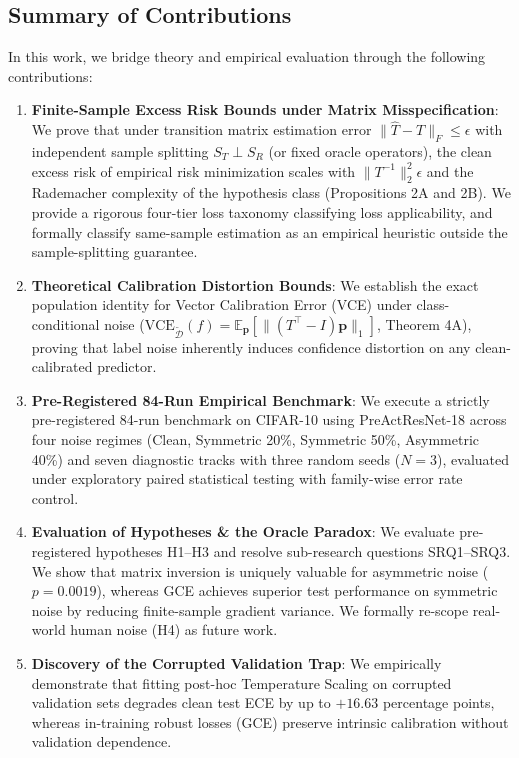 \documentclass[10pt,twocolumn]{article}
\theoremstyle{definition}
\begin{document}
\subsection{Summary of Contributions}
In this work, we bridge theory and empirical evaluation through the following contributions:
\begin{enumerate}
    \item \textbf{Finite-Sample Excess Risk Bounds under Matrix Misspecification}: We prove that under transition matrix estimation error $\|\hat{T} - T\|_F \le \epsilon$ with independent sample splitting $S_T \perp S_R$ (or fixed oracle operators), the clean excess risk of empirical risk minimization scales with $\|T^{-1}\|_2^2 \epsilon$ and the Rademacher complexity of the hypothesis class (Propositions 2A and 2B). We provide a rigorous four-tier loss taxonomy classifying loss applicability, and formally classify same-sample estimation as an empirical heuristic outside the sample-splitting guarantee.
    \item \textbf{Theoretical Calibration Distortion Bounds}: We establish the exact population identity for Vector Calibration Error (VCE) under class-conditional noise ($\text{VCE}_{\tilde{\mathcal{D}}}(f) = \mathbb{E}_{\mathbf{p}}[\|(T^\top - I)\mathbf{p}\|_1]$, Theorem 4A), proving that label noise inherently induces confidence distortion on any clean-calibrated predictor.
    \item \textbf{Pre-Registered 84-Run Empirical Benchmark}: We execute a strictly pre-registered 84-run benchmark on CIFAR-10 using PreActResNet-18 across four noise regimes (Clean, Symmetric 20\%, Symmetric 50\%, Asymmetric 40\%) and seven diagnostic tracks with three random seeds ($N=3$), evaluated under exploratory paired statistical testing with family-wise error rate control.
    \item \textbf{Evaluation of Hypotheses \& the Oracle Paradox}: We evaluate pre-registered hypotheses H1--H3 and resolve sub-research questions SRQ1--SRQ3. We show that matrix inversion is uniquely valuable for asymmetric noise ($p=0.0019$), whereas GCE achieves superior test performance on symmetric noise by reducing finite-sample gradient variance. We formally re-scope real-world human noise (H4) as future work.
    \item \textbf{Discovery of the Corrupted Validation Trap}: We empirically demonstrate that fitting post-hoc Temperature Scaling on corrupted validation sets degrades clean test ECE by up to $+16.63$ percentage points, whereas in-training robust losses (GCE) preserve intrinsic calibration without validation dependence.
\end{enumerate}
\end{document}
